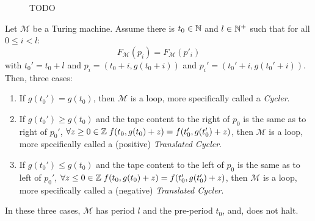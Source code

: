 \begin{figure}[h!]
\begin{minipage}[t]{0.5\textwidth}
{\begin{tikzpicture}[every node/.style={minimum size=6mm, draw, font=\scriptsize}, scale=1]


            \end{tikzpicture}
        }
    \end{minipage}
    \caption{TODO}\label{fig:loop-proof}
\end{figure}

\begin{theorem}[Loops]\label{th:loops:theory} Let $\mathcal{M}$ be a Turing machine.
    Assume there is $ t_0 \in \N$ and $l \in \N^+$ such that
    for all $0 \leq i < l$: $$F_\mathcal{M}(p_i)   = F_\mathcal{M}(p'_i)$$
    with $t_0' = t_0+l$ and $p_i = (t_0+i, g(t_0+i))$ and $p_i' = (t_0'+i, g(t_0'+i))$. Then, three cases:
    \begin{enumerate}
        \item If $g(t_0') = g(t_0)$, then $\mathcal{M}$ is a loop, more specifically called a \textit{Cycler}.\label{th:case1}
        \item If $g(t_0') \geq g(t_0)$ and the tape content to the right of $p_0$ is the same as to right of $p_0'$, \ie $\forall z \geq 0 \in  \Z \; f(t_0,g(t_0)+z) = f(t_0',g(t_0')+z)$, then $\mathcal{M}$ is a loop, more specifically called a (positive) \textit{Translated Cycler}.\label{th:case2}
        \item If $g(t_0') \leq g(t_0)$ and the tape content to the left of $p_0$ is the same as to left of $p_0'$, \ie $\forall z \leq 0 \in \Z \; f(t_0,g(t_0)+z) = f(t_0',g(t_0')+z)$, then $\mathcal{M}$ is a loop, more specifically called a (negative) \textit{Translated Cycler}.\label{th:case3}
    \end{enumerate}
    In these three cases, $\mathcal{M}$ has period $l$ and the pre-period $t_0$, and, does not halt.
\end{theorem}

